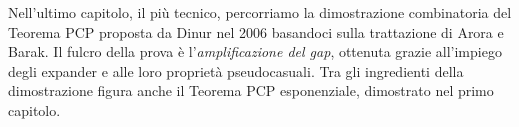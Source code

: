 Nell'ultimo capitolo, il più tecnico, percorriamo la dimostrazione combinatoria
del Teorema PCP proposta da Dinur nel 2006 basandoci sulla trattazione di
Arora e Barak.
Il fulcro della prova è l'\emph{amplificazione del gap}, ottenuta grazie
all'impiego degli expander e alle loro proprietà pseudocasuali.
Tra gli ingredienti della dimostrazione figura anche il Teorema PCP
esponenziale, dimostrato nel primo capitolo.
